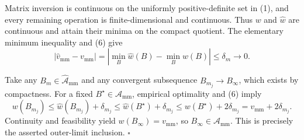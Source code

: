 Matrix inversion is continuous on the uniformly positive-definite set in (1), and every remaining operation is finite-dimensional and continuous. Thus \(w\) and \(\widehat w\) are continuous and attain their minima on the compact quotient. The elementary minimum inequality and (6) give
\[
|\widehat v_{\mathrm{mm}}-v_{\mathrm{mm}}|
=\left|\min_B\widehat w(B)-\min_Bw(B)\right|
\le\delta_m\longrightarrow0. \tag{7}
\]

Take any \(B_m\in\widehat{\mathcal A}_{\mathrm{mm}}\) and any convergent subsequence \(B_{m_j}\to B_\infty\), which exists by compactness. For a fixed \(B^\star\in\mathcal A_{\mathrm{mm}}\), empirical optimality and (6) imply
\[
w(B_{m_j})
\le\widehat w(B_{m_j})+\delta_{m_j}
\le\widehat w(B^\star)+\delta_{m_j}
\le w(B^\star)+2\delta_{m_j}
=v_{\mathrm{mm}}+2\delta_{m_j}.
\]
Continuity and feasibility yield \(w(B_\infty)=v_{\mathrm{mm}}\), so \(B_\infty\in\mathcal A_{\mathrm{mm}}\). This is precisely the asserted outer-limit inclusion. \(\square\)
